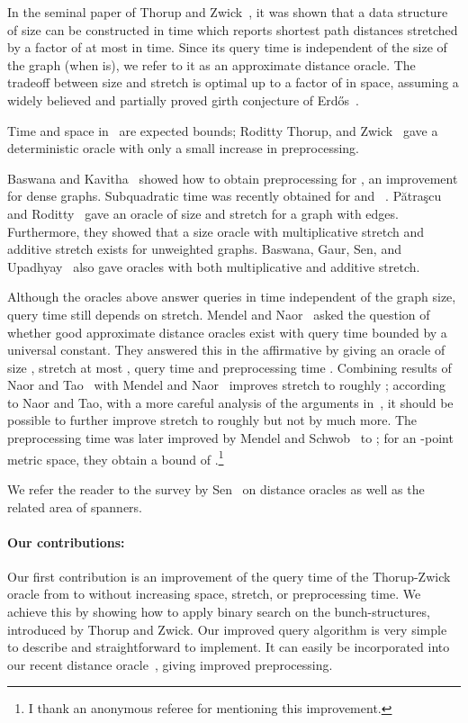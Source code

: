 \documentclass[11pt]{article}
\begin{document}
In the seminal paper of Thorup and Zwick~\cite{ThorupZwick}, it was shown
that a data structure of size  can be constructed in
 time which reports shortest path distances stretched by a factor of at most  in  time. Since its query time is independent of
the size of the graph (when  is), we refer to it as an approximate distance
oracle. The tradeoff between size and stretch is optimal up to a factor of  in space, assuming a widely believed
and partially proved girth conjecture of Erd\H{o}s~\cite{Erdos}.

Time and space in~\cite{ThorupZwick} are expected bounds; Roditty Thorup, and Zwick~\cite{DetOracleSpanner} gave a deterministic
oracle with only a small increase in preprocessing.

Baswana and Kavitha~\cite{APASP} showed how to obtain  preprocessing for , an improvement for dense graphs.
Subquadratic time was recently obtained for  and ~\cite{SubquadraticOracleCWN}. P\u{a}tra\c{s}cu and
Roditty~\cite{Patrascu} gave an oracle of size  and stretch  for a graph with  edges.
Furthermore, they showed that a size  oracle with multiplicative stretch  and additive stretch  exists for unweighted
graphs. Baswana, Gaur, Sen, and Upadhyay~\cite{SubquadraticOracle} also gave oracles with both multiplicative and additive stretch.

Although the oracles above answer queries in time independent of the graph size, query time still depends on
stretch. Mendel and Naor~\cite{MendelNaor} asked the question of whether good approximate distance oracles exist with query time
bounded by a universal constant. They answered this in the affirmative by giving an oracle of size , stretch at
most , query time  and preprocessing time . Combining results of Naor and Tao~\cite{NaorTao} with Mendel and 
Naor~\cite{MendelNaor}
improves stretch to roughly ; according to Naor and Tao, with a more
careful analysis of the arguments in~\cite{MendelNaor}, it should be possible
to further improve stretch to roughly  but not by much more.
The  preprocessing time was later improved by Mendel and Schwob~\cite{CKR} to ; for an
-point metric space, they obtain a bound of .\footnote{I thank an anonymous referee for mentioning this improvement.}

We refer the reader to the survey by Sen~\cite{DistOracleSpannerSurvey} on distance oracles as well as the related area of spanners.

\paragraph{Our contributions:}
Our first contribution is an improvement of the query time of the Thorup-Zwick oracle from  to  without
increasing space, stretch, or preprocessing time. We achieve this by showing how to apply binary search on the bunch-structures,
introduced by Thorup and Zwick. Our improved query algorithm is very simple to describe and straightforward to implement.
It can easily be incorporated into our recent distance oracle~\cite{SubquadraticOracleCWN}, giving improved
preprocessing.
\end{document}
